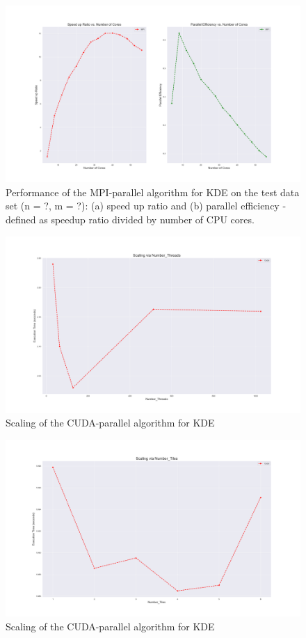 \documentclass[review]{elsarticle}
\begin{document}
\begin{figure}
  \centering
  \includegraphics[scale=0.35]{figures/mpi_speedup_efficiency.png}
  \caption{Performance of the MPI-parallel algorithm for  KDE on the test data set (n = ?, m = ?): (a) speed up ratio and (b) parallel efficiency - defined as speedup ratio divided by number of CPU cores.}
  \label{fig:mpi_speedup_efficiency}
\end{figure}

\begin{figure}
  \centering
  \includegraphics[scale=0.35]{figures/cuda_threads.png}
  \caption{Scaling of the CUDA-parallel algorithm for KDE}
  \label{fig:cuda_threads}
\end{figure}

\begin{figure}
  \centering
  \includegraphics[scale=0.35]{figures/cuda_tiles.png}
   \caption{Scaling of the CUDA-parallel algorithm for KDE}
  \label{fig:cuda_tiles}
\end{figure}
\end{document}
